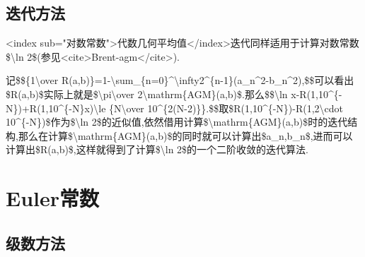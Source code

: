 \documentclass[
]{article}
\begin{document}
\hypertarget{ux8fedux4ee3ux65b9ux6cd5-1}{%
\subsection{迭代方法}\label{ux8fedux4ee3ux65b9ux6cd5-1}}

\textless index
sub="对数常数"\textgreater 代数几何平均值\textless/index\textgreater 迭代同样适用于计算对数常数\$\textbackslash ln
2\$(参见\textless cite\textgreater Brent-agm\textless/cite\textgreater).

记\$\$\{1\textbackslash over
R(a,b)\}=1-\textbackslash sum\_\{n=0\}\^{}\textbackslash infty2\^{}\{n-1\}(a\_n\^{}2-b\_n\^{}2),\$\$可以看出\$R(a,b)\$实际上就是\$\textbackslash pi\textbackslash over
2\textbackslash mathrm\{AGM\}(a,b)\$.那么\$\$\textbar\textbackslash ln
x-R(1,10\^{}\{-N\})+R(1,10\^{}\{-N\}x)\textbar\textbackslash le
\{N\textbackslash over
10\^{}\{2(N-2)\}\}.\$\$取\$R(1,10\^{}\{-N\})-R(1,2\textbackslash cdot
10\^{}\{-N\})\$作为\$\textbackslash ln
2\$的近似值,依然借用计算\$\textbackslash mathrm\{AGM\}(a,b)\$时的迭代结构,那么在计算\$\textbackslash mathrm\{AGM\}(a,b)\$的同时就可以计算出\$a\_n,b\_n\$,进而可以计算出\$R(a,b)\$,这样就得到了计算\$\textbackslash ln
2\$的一个二阶收敛的迭代算法.

\hypertarget{eulerux5e38ux6570}{%
\section{Euler常数}\label{eulerux5e38ux6570}}

\hypertarget{ux7ea7ux6570ux65b9ux6cd5-3}{%
\subsection{级数方法}\label{ux7ea7ux6570ux65b9ux6cd5-3}}
\end{document}
